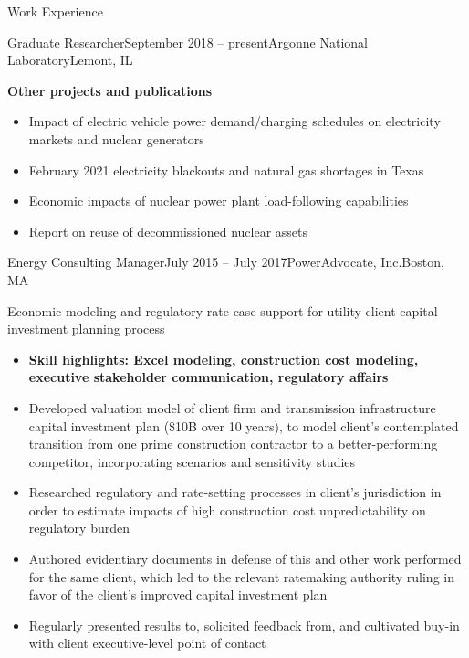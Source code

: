 \documentclass{resume} %
\begin{document}
\begin{rSection}{Work Experience}
\begin{rSubsection}{Graduate Researcher}{September 2018 -- present}{Argonne National Laboratory}{Lemont, IL}
  \item \textbf{Other projects and publications}
  \begin{itemize}
    \item Impact of electric vehicle power demand/charging schedules on electricity markets and nuclear generators
    \item February 2021 electricity blackouts and natural gas shortages in Texas
    \item Economic impacts of nuclear power plant load-following capabilities
    \item Report on reuse of decommissioned nuclear assets
  \end{itemize}

\end{rSubsection}


\begin{rSubsection}{Energy Consulting Manager}{July 2015 -- July 2017}{PowerAdvocate, Inc.}{Boston, MA}
  \setlength{\itemsep}{-3pt}
  \item Economic modeling and regulatory rate-case support for utility client capital investment planning process
  \begin{itemize}
    \item \textbf{Skill highlights: Excel modeling, construction cost modeling, executive stakeholder communication, regulatory affairs}
    \item Developed valuation model of client firm and transmission infrastructure capital investment plan (\$10B over 10 years), to model client's contemplated transition from one prime construction contractor to a better-performing competitor, incorporating scenarios and sensitivity studies
    \item Researched regulatory and rate-setting processes in client's jurisdiction in order to estimate impacts of high construction cost unpredictability on regulatory burden
    \item Authored evidentiary documents in defense of this and other work performed for the same client, which led to the relevant ratemaking authority ruling in favor of the client's improved capital investment plan
    \item Regularly presented results to, solicited feedback from, and cultivated buy-in with client executive-level point of contact
  \end{itemize}
\end{rSubsection}


\end{rSection}
\end{document}

